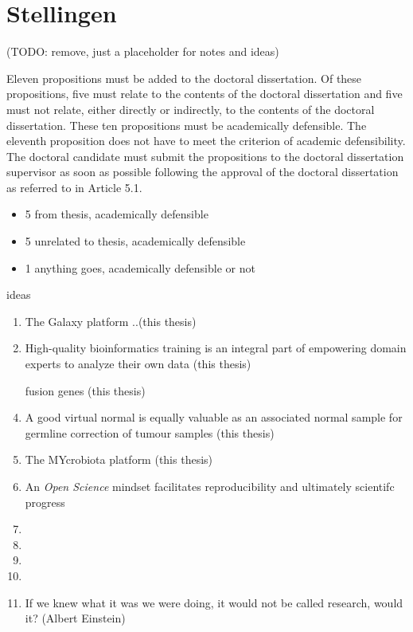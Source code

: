 \chapter*{Stellingen}

(TODO: remove, just a placeholder for notes and ideas)


Eleven propositions must be added to the doctoral dissertation. Of these propositions,
five must relate to the contents of the doctoral dissertation and five must not relate,
either directly or indirectly, to the contents of the doctoral dissertation. These ten
propositions must be academically defensible. The eleventh proposition does not have
to meet the criterion of academic defensibility. The doctoral candidate must submit the
propositions to the doctoral dissertation supervisor as soon as possible following the
approval of the doctoral dissertation as referred to in Article 5.1.

\begin{itemize}
\item 5 from thesis, academically defensible
\item 5 unrelated to thesis, academically defensible
\item 1 anything goes, academically defensible or not
\end{itemize}

ideas

\begin{enumerate}
\item The Galaxy platform ..(this thesis)
\item High-quality bioinformatics training is an integral part of empowering domain experts to analyze their own data (this thesis)
\item [fusion genes] (this thesis)
\item A good virtual normal is equally valuable as an associated normal sample for germline correction of tumour samples (this thesis)
\item The MYcrobiota platform  (this thesis)
\item An \textit{Open Science} mindset facilitates reproducibility and ultimately scientifc progress
\item
\item
\item
\item
\item If we knew what it was we were doing, it would not be called research, would it? (Albert Einstein)
\end{enumerate}

